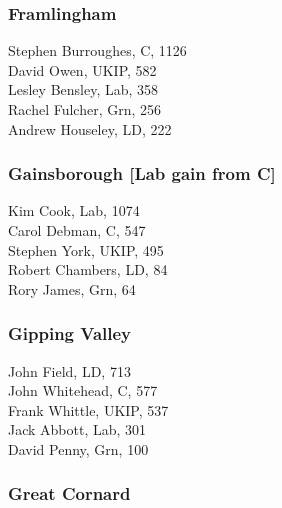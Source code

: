 \documentclass[a4paper,openany,10pt]{book}
\begin{document}
\subsubsection*{Framlingham}



Stephen Burroughes, C, 1126\\
David Owen, UKIP, 582\\
Lesley Bensley, Lab, 358\\
Rachel Fulcher, Grn, 256\\
Andrew Houseley, LD, 222\\


\subsubsection*{Gainsborough \hspace*{\fill}\nolinebreak[1]%
\enspace\hspace*{\fill}
[Lab gain from C]}



Kim Cook, Lab, 1074\\
Carol Debman, C, 547\\
Stephen York, UKIP, 495\\
Robert Chambers, LD, 84\\
Rory James, Grn, 64\\


\subsubsection*{Gipping Valley}



John Field, LD, 713\\
John Whitehead, C, 577\\
Frank Whittle, UKIP, 537\\
Jack Abbott, Lab, 301\\
David Penny, Grn, 100\\


\subsubsection*{Great Cornard}

\end{document}
